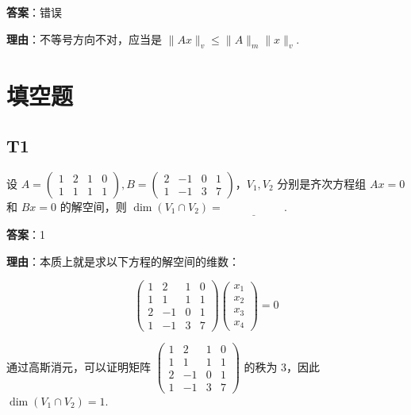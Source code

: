\documentclass{article}
\begin{document}
\par \textbf{答案}：错误

\par \textbf{理由}：不等号方向不对，应当是 $\|Ax\|_v\leq \|A\|_m \|x\|_v$.

\section{填空题}

\subsection{T1}

\par 设 $A=\begin{pmatrix}
	1 & 2 & 1 & 0\\
	1 & 1 & 1 & 1
\end{pmatrix}, B = \begin{pmatrix}
	2 & -1 & 0 & 1\\
	1 & -1 & 3 & 7
\end{pmatrix}$，$V_1, V_2$ 分别是齐次方程组 $Ax=0$ 和 $Bx=0$ 的解空间，则 $\dim(V_1\cap V_2)=\underline{\phantom{empty\_space}}$.

\par \textbf{答案}：1

\par \textbf{理由}：本质上就是求以下方程的解空间的维数：

\begin{equation*}
	\begin{pmatrix}
		1 & 2 & 1 & 0\\
		1 & 1 & 1 & 1\\
		2 & -1 & 0 & 1\\
		1 & -1 & 3 & 7
	\end{pmatrix} \begin{pmatrix}
		x_1\\x_2\\x_3\\x_4
	\end{pmatrix}=0
\end{equation*}

\par 通过高斯消元，可以证明矩阵 $\begin{pmatrix}
	1 & 2 & 1 & 0\\
	1 & 1 & 1 & 1\\
	2 & -1 & 0 & 1\\
	1 & -1 & 3 & 7
\end{pmatrix}$ 的秩为 3，因此 $\dim(V_1\cap V_2)=1$.
\end{document}
